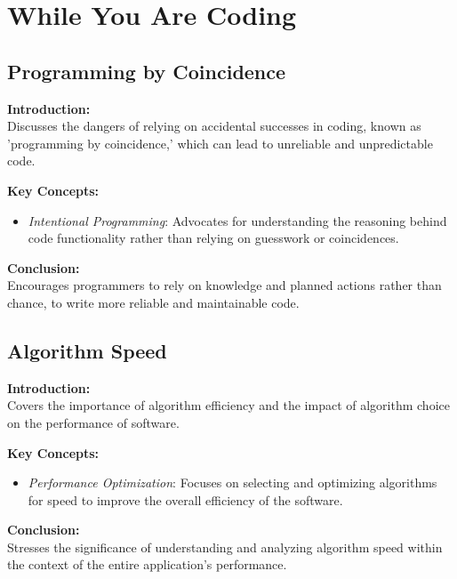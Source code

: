 \section{While You Are Coding}

\subsection{Programming by Coincidence}

\textbf{Introduction:} \\
Discusses the dangers of relying on accidental successes in coding, known as 'programming by coincidence,' which can lead to unreliable and unpredictable code.

\vspace{2mm}
\noindent\textbf{Key Concepts:}
\begin{itemize}
  \item \textit{Intentional Programming}: Advocates for understanding the reasoning behind code functionality rather than relying on guesswork or coincidences.
\end{itemize}

\vspace{2mm}
\noindent\textbf{Conclusion:} \\
Encourages programmers to rely on knowledge and planned actions rather than chance, to write more reliable and maintainable code.

\subsection{Algorithm Speed}

\textbf{Introduction:} \\
Covers the importance of algorithm efficiency and the impact of algorithm choice on the performance of software.

\vspace{2mm}
\noindent\textbf{Key Concepts:}
\begin{itemize}
  \item \textit{Performance Optimization}: Focuses on selecting and optimizing algorithms for speed to improve the overall efficiency of the software.
\end{itemize}

\vspace{2mm}
\noindent\textbf{Conclusion:} \\
Stresses the significance of understanding and analyzing algorithm speed within the context of the entire application's performance.


